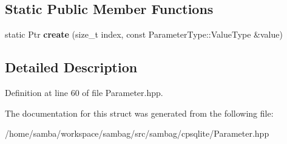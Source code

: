 \subsection*{Static Public Member Functions}
\begin{DoxyCompactItemize}
\item 
\hypertarget{structsambag_1_1cpsqlite_1_1_double_parameter_a8db4e2b45fa982a058fcff78fb79c92f}{
static Ptr {\bfseries create} (size\_\-t index, const ParameterType::ValueType \&value)}
\label{structsambag_1_1cpsqlite_1_1_double_parameter_a8db4e2b45fa982a058fcff78fb79c92f}

\end{DoxyCompactItemize}


\subsection{Detailed Description}


Definition at line 60 of file Parameter.hpp.



The documentation for this struct was generated from the following file:\begin{DoxyCompactItemize}
\item 
/home/samba/workspace/sambag/src/sambag/cpsqlite/Parameter.hpp\end{DoxyCompactItemize}

